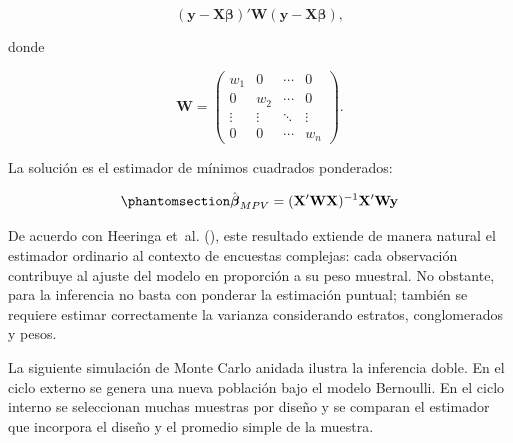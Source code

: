 \documentclass[
  spanish,
  11pt,
  letterpaper,
  oneside,
  open=any]{scrbook}
\begin{document}
\[
(\mathbf{y}-\mathbf{X}\boldsymbol{\beta})'\mathbf{W}(\mathbf{y}-\mathbf{X}\boldsymbol{\beta}),
\]

donde

\[
\mathbf{W}=
\begin{pmatrix}
w_1 & 0 & \cdots & 0\\
0 & w_2 & \cdots & 0\\
\vdots & \vdots & \ddots & \vdots\\
0 & 0 & \cdots & w_n
\end{pmatrix}.
\]

La solución es el estimador de mínimos cuadrados ponderados:

\begin{equation}\protect\phantomsection\label{eq-coeficientes-mpv}{
\hat{\boldsymbol{\beta}}_{MPV}
= (\mathbf{X}'\mathbf{W}\mathbf{X})^{-1}\mathbf{X}'\mathbf{W}\mathbf{y}
}\end{equation}

De acuerdo con Heeringa et~al.
(), este resultado extiende
de manera natural el estimador ordinario al contexto de encuestas
complejas: cada observación contribuye al ajuste del modelo en
proporción a su peso muestral. No obstante, para la inferencia no basta
con ponderar la estimación puntual; también se requiere estimar
correctamente la varianza considerando estratos, conglomerados y pesos.

La siguiente simulación de Monte Carlo anidada ilustra la inferencia
doble. En el ciclo externo se genera una nueva población bajo el modelo
Bernoulli. En el ciclo interno se seleccionan muchas muestras por diseño
y se comparan el estimador que incorpora el diseño y el promedio simple
de la muestra.
\end{document}
